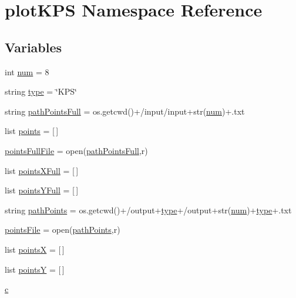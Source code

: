 \hypertarget{namespaceplotKPS}{}\section{plot\+K\+PS Namespace Reference}
\label{namespaceplotKPS}
\subsection*{Variables}
\begin{DoxyCompactItemize}
\item 
int \hyperlink{namespaceplotKPS_a7d067860f384d4514b73bb9d364df084}{num} = 8
\item 
string \hyperlink{namespaceplotKPS_a6f353d1e228ea6b30f24563026ecb40c}{type} = \char`\"{}K\+PS\char`\"{}
\item 
string \hyperlink{namespaceplotKPS_abff4301b2725775317d29ad1956d8cc3}{path\+Points\+Full} = os.\+getcwd()+\textquotesingle{}/input/input\textquotesingle{}+str(\hyperlink{namespaceplotKPS_a7d067860f384d4514b73bb9d364df084}{num})+\textquotesingle{}.txt\textquotesingle{}
\item 
list \hyperlink{namespaceplotKPS_a48ccbb4e710dfebea784f34b91a3b8b7}{points} = \mbox{[}$\,$\mbox{]}
\item 
\hyperlink{namespaceplotKPS_a163726d3306fbdcaaa77215db0205452}{points\+Full\+File} = open(\hyperlink{namespaceplotKPS_abff4301b2725775317d29ad1956d8cc3}{path\+Points\+Full},\textquotesingle{}r\textquotesingle{})
\item 
list \hyperlink{namespaceplotKPS_aca0b8d5972b4405cee64b721b05fe69b}{points\+X\+Full} = \mbox{[}$\,$\mbox{]}
\item 
list \hyperlink{namespaceplotKPS_ad03be08fd881cef42cd8fbb5dda7d68e}{points\+Y\+Full} = \mbox{[}$\,$\mbox{]}
\item 
string \hyperlink{namespaceplotKPS_a67510e87215a8d35ba91887dad2ce7c0}{path\+Points} = os.\+getcwd()+\textquotesingle{}/output\textquotesingle{}+\hyperlink{namespaceplotKPS_a6f353d1e228ea6b30f24563026ecb40c}{type}+\textquotesingle{}/output\textquotesingle{}+str(\hyperlink{namespaceplotKPS_a7d067860f384d4514b73bb9d364df084}{num})+\hyperlink{namespaceplotKPS_a6f353d1e228ea6b30f24563026ecb40c}{type}+\textquotesingle{}.txt\textquotesingle{}
\item 
\hyperlink{namespaceplotKPS_ac7f5dbe4ce237b1140497a2bf4fbf16e}{points\+File} = open(\hyperlink{namespaceplotKPS_a67510e87215a8d35ba91887dad2ce7c0}{path\+Points},\textquotesingle{}r\textquotesingle{})
\item 
list \hyperlink{namespaceplotKPS_abd755cad257acc579edd18d4fc485ae6}{pointsX} = \mbox{[}$\,$\mbox{]}
\item 
list \hyperlink{namespaceplotKPS_afe7f323931691a3471bbf3f21066f2ec}{pointsY} = \mbox{[}$\,$\mbox{]}
\item 
\hyperlink{namespaceplotKPS_ac5170bd98bd37eefaafd02ca9e4afddb}{c}
\end{DoxyCompactItemize}


